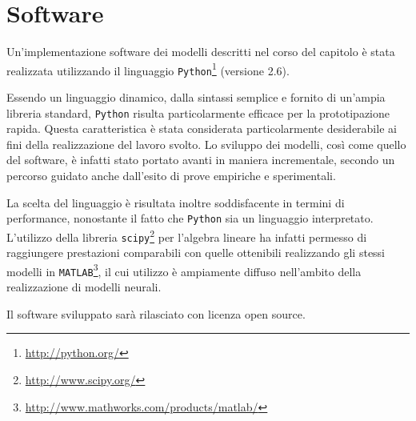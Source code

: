 \section{Software}\label{ch:modelli:software}
Un'implementazione software dei modelli descritti nel corso del capitolo è stata realizzata utilizzando il linguaggio \texttt{Python}\footnote{\url{http://python.org/}} (versione 2.6). 

Essendo un linguaggio dinamico, dalla sintassi semplice e fornito di un'ampia libreria standard, \texttt{Python} risulta particolarmente efficace per la prototipazione rapida. Questa caratteristica è stata considerata particolarmente desiderabile ai fini della realizzazione del lavoro svolto. Lo sviluppo dei modelli, così come quello del software, è infatti stato portato avanti in maniera incrementale, secondo un percorso guidato anche dall'esito di prove empiriche e sperimentali.

La scelta del linguaggio è risultata inoltre soddisfacente in termini di performance, nonostante il fatto che \texttt{Python} sia un linguaggio interpretato. L'utilizzo della libreria \texttt{scipy}\footnote{\url{http://www.scipy.org/}} per l'algebra lineare ha infatti permesso di raggiungere prestazioni comparabili con quelle ottenibili realizzando gli stessi modelli in \texttt{MATLAB}\footnote{\url{http://www.mathworks.com/products/matlab/}}, il cui utilizzo è ampiamente diffuso nell'ambito della realizzazione di modelli neurali.

Il software sviluppato sarà rilasciato con licenza open source.




